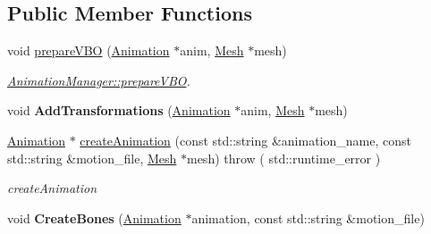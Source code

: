 \subsection*{Public Member Functions}
\begin{DoxyCompactItemize}
\item 
void \hyperlink{classEngine_1_1AnimationManager_a4d2622e81e065e7d55fe0c127b26ad33}{prepare\+V\+B\+O} (\hyperlink{classEngine_1_1Animation}{Animation} $\ast$anim, \hyperlink{classEngine_1_1Mesh}{Mesh} $\ast$mesh)
\begin{DoxyCompactList}\small\item\em \hyperlink{classEngine_1_1AnimationManager_a4d2622e81e065e7d55fe0c127b26ad33}{Animation\+Manager\+::prepare\+V\+B\+O}. \end{DoxyCompactList}\item 
\hypertarget{classEngine_1_1AnimationManager_a62d0a57ab543057eaf245d37b486a752}{}void {\bfseries Add\+Transformations} (\hyperlink{classEngine_1_1Animation}{Animation} $\ast$anim, \hyperlink{classEngine_1_1Mesh}{Mesh} $\ast$mesh)\label{classEngine_1_1AnimationManager_a62d0a57ab543057eaf245d37b486a752}

\item 
\hyperlink{classEngine_1_1Animation}{Animation} $\ast$ \hyperlink{classEngine_1_1AnimationManager_a9bfe9218d60ae4d9ea5c0911813f7f8d}{create\+Animation} (const std\+::string \&animation\+\_\+name, const std\+::string \&motion\+\_\+file, \hyperlink{classEngine_1_1Mesh}{Mesh} $\ast$mesh)  throw ( std\+::runtime\+\_\+error )
\begin{DoxyCompactList}\small\item\em create\+Animation \end{DoxyCompactList}\item 
\hypertarget{classEngine_1_1AnimationManager_acb671d94e2ddf41b9e0e2e0ee07d51f2}{}void {\bfseries Create\+Bones} (\hyperlink{classEngine_1_1Animation}{Animation} $\ast$animation, const std\+::string \&motion\+\_\+file)\label{classEngine_1_1AnimationManager_acb671d94e2ddf41b9e0e2e0ee07d51f2}


\end{DoxyCompactItemize}
